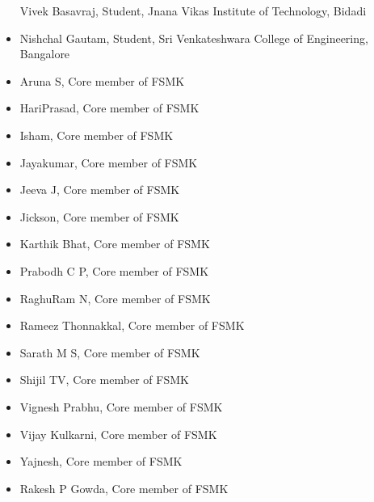 \begin{itemize}
  Vivek Basavraj, Student, Jnana Vikas Institute of Technology, Bidadi
\item
  Nishchal Gautam, Student, Sri Venkateshwara College of Engineering,
  Bangalore
\item
  Aruna S, Core member of FSMK
\item
  HariPrasad, Core member of FSMK
\item
  Isham, Core member of FSMK
\item
  Jayakumar, Core member of FSMK
\item
  Jeeva J, Core member of FSMK
\item
  Jickson, Core member of FSMK
\item
  Karthik Bhat, Core member of FSMK
\item
  Prabodh C P, Core member of FSMK
\item
  RaghuRam N, Core member of FSMK
\item
  Rameez Thonnakkal, Core member of FSMK
\item
  Sarath M S, Core member of FSMK
\item
  Shijil TV, Core member of FSMK
\item
  Vignesh Prabhu, Core member of FSMK
\item
  Vijay Kulkarni, Core member of FSMK
\item
  Yajnesh, Core member of FSMK
\item
  Rakesh P Gowda, Core member of FSMK
\end{itemize}
